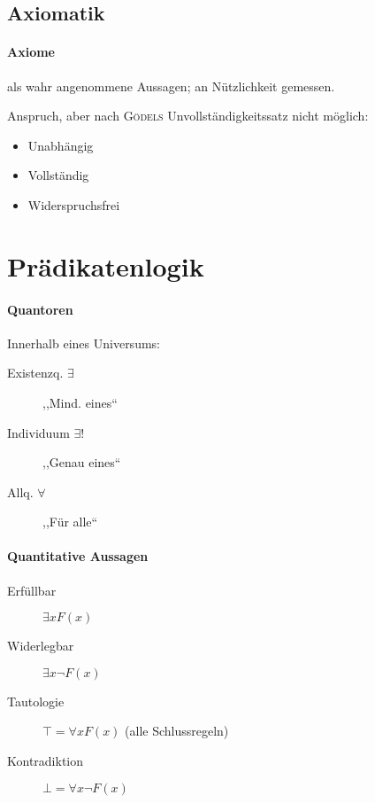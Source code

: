 \subsection{Axiomatik}

\paragraph{Axiome} als wahr angenommene Aussagen; an Nützlichkeit gemessen.

Anspruch, aber nach \textsc{Gödels}  Unvollständigkeitssatz nicht möglich:

\begin{itemize}
  \item Unabhängig
  \item Vollständig
  \item Widerspruchsfrei
\end{itemize}

\section{Prädikatenlogik}

\paragraph{Quantoren} Innerhalb eines Universums:

\begin{description}
  \item [Existenzq. $\exists$]
        ,,Mind. eines``

  \item [Individuum $\exists!$]
        ,,Genau eines``

  \item [Allq. $\forall$ ]
        ,,Für alle``
\end{description}

\paragraph{Quantitative Aussagen}

\begin{description}
  \item[Erfüllbar]
    $\exists x F(x)$

  \item[Widerlegbar]
    $\exists x \neg F(x)$

  \item[Tautologie]
    $\top = \forall x F(x)$
    (alle Schlussregeln)

  \item[Kontradiktion]
    $\bot = \forall x \neg F(x)$
\end{description}

